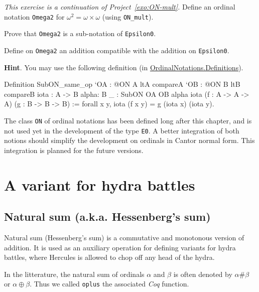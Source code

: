 \documentclass[a4paper]{book}
\begin{document}
\begin{project}
 \emph{This exercise is a continuation of Project~\vref{exo:ON-mult}.}
Define an ordinal notation \texttt{Omega2} for $\omega^2=\omega\times\omega$ (using
\texttt{ON\_mult}). 

Prove that \texttt{Omega2} is a sub-notation of \texttt{Epsilon0}.

Define on \texttt{Omega2} an addition compatible with the addition on \texttt{Epsilon0}.

\textbf{Hint}. You may use the following definition (in 
\href{../src/html/hydras.OrdinalNotations.Definitions.html}{OrdinalNotations.Definitions}).

\begin{Coqsrc}
Definition SubON_same_op  `{OA : @ON A ltA  compareA}
       `{OB : @ON B ltB  compareB}
       {iota : A -> B} 
       {alpha: B}
       {_ : SubON OA OB alpha iota}
       (f : A -> A -> A)
       (g : B -> B -> B)
  :=
  forall x y,  iota (f x y) = g (iota x) (iota y).
\end{Coqsrc}

\end{project}

\begin{project}
The class \texttt{ON} of ordinal notations has been defined long after this 
chapter, and is not used yet in the development of the type \texttt{E0}. 
A better integration of both notions should simplify the development on ordinals in Cantor normal form. This integration is planned for the future versions.

\end{project}


\section{A variant for hydra battles}

\subsection{Natural sum (a.k.a. Hessenberg's  sum)}
\label{sec:orgheadline87}
\label{hydra-variant}

Natural sum (Hessenberg's  sum) is a commutative and monotonous version of
addition. It is used as an auxiliary operation  for defining variants
for hydra battles, where Hercules is allowed to chop off any  head of the hydra.

In the litterature, the natural sum of ordinals \(\alpha\) and \(\beta\) 
is often denoted by \(\alpha \# \beta\)  or  \(\alpha \oplus  \beta\).
Thus we called \texttt{oplus} the associated \emph{Coq} function.
\end{document}
